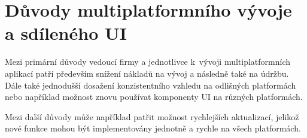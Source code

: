 \section{Důvody multiplatformního vývoje a sdíleného UI}

Mezi primární důvody vedoucí firmy a jednotlivce k~vývoji multiplatformních aplikací patří především
snížení nákladů na vývoj a následně také na údržbu. \cite{crossPlatformFrameworks} Dále také jednodušší dosažení konzistentního vzhledu
na odlišných platformách nebo například možnost znovu používat komponenty UI na různých platformách.

Mezi další důvody může například patřit možnost rychlejších aktualizací, jelikož nové funkce mohou být 
implementovány jednotně a rychle na všech platformách. 
